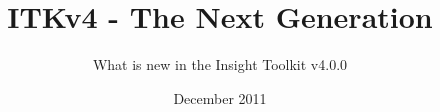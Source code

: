 \documentclass[18pt]{beamer}
\newcommand{\centeredlargetext}[3]{
{
\setbeamertemplate{background}{}
\setbeamertemplate{navigation symbols}{}
\setbeamercolor{background canvas}{bg={#1}}
\color{#2}
\begin{frame}[plain]
\fontsize{36pt}{36pt}\selectfont
\center
\begin{center}
{#3}
\end{center}
\end{frame}
}}
\begin{document}
\title[ITKv4]{ITKv4 - The Next Generation}
\subtitle[ITKv4]{What is new in the Insight Toolkit v4.0.0}
\date[December 2011]{December 2011}

\begin{frame}
\titlepage
\end{frame}






%


%


%

%

%

%

%

%


%



\end{document}
